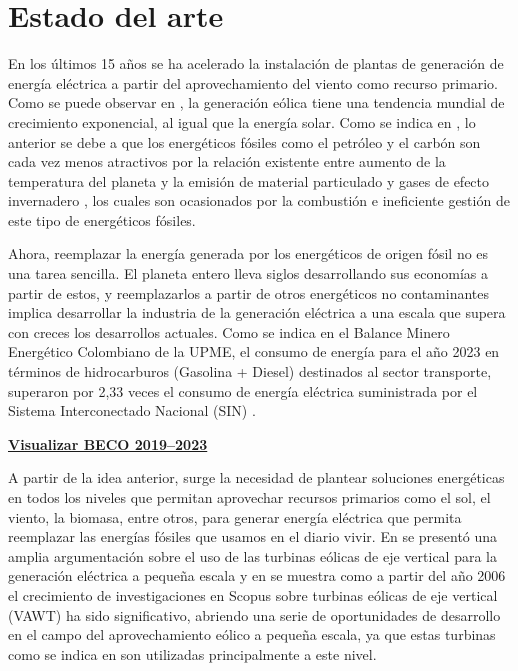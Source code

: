 \documentclass[letterpaper,12pt, oneside]{book}
\begin{document}
\section{Estado del arte} \label{sec5}

En los últimos 15 años se ha acelerado la instalación de plantas de generación de energía eléctrica a partir del aprovechamiento del viento como recurso primario. Como se puede observar en \cite{ref25}, la generación eólica tiene una tendencia mundial de crecimiento exponencial, al igual que la energía solar. Como se indica en \cite{ref26}, lo anterior se debe a que los energéticos fósiles como el petróleo y el carbón son cada vez menos atractivos por la relación existente entre aumento de la temperatura del planeta y la emisión de material particulado y gases de efecto invernadero \cite{ref27}, los cuales son ocasionados por la combustión e ineficiente gestión de este tipo de energéticos fósiles. 

Ahora, reemplazar la energía generada por los energéticos de origen fósil no es una tarea sencilla. El planeta entero lleva siglos desarrollando sus economías a partir de estos, y reemplazarlos a partir de otros energéticos no contaminantes implica desarrollar la industria de la generación eléctrica a una escala que supera con creces los desarrollos actuales. Como se indica en el Balance Minero Energético Colombiano de la UPME, el consumo de energía para el año 2023 en términos de hidrocarburos (Gasolina + Diesel) destinados al sector transporte, superaron por 2,33 veces el consumo de energía eléctrica suministrada por el Sistema Interconectado Nacional (SIN) \cite{ref28}.

\textbf{\href{https://andres25.shinyapps.io/BECO19-23/#1}{Visualizar BECO 2019--2023}}

A partir de la idea anterior, surge la necesidad de plantear soluciones energéticas en todos los niveles que permitan aprovechar recursos primarios como el sol, el viento, la biomasa, entre otros, para generar energía eléctrica que permita reemplazar las energías fósiles que usamos en el diario vivir. En \cite{ref12}  se presentó una amplia argumentación sobre el uso de las turbinas eólicas de eje vertical para la generación eléctrica a pequeña escala y en \cite{ref29} se muestra como a partir del año 2006 el crecimiento de investigaciones en Scopus sobre turbinas eólicas de eje vertical (VAWT) ha sido significativo, abriendo una serie de oportunidades de desarrollo en el campo del aprovechamiento eólico a pequeña escala, ya que estas turbinas como se indica en \cite{ref12} son utilizadas principalmente a este nivel. 
\end{document}
